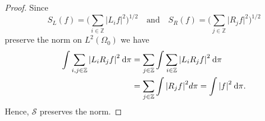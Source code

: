 \documentclass[a4paper]{amsart}
\newcommand{\abs}[1]{{\lvert {#1} \rvert}}
\newcommand{\dpi}{{\: \rm d}\pi}
\newcommand{\ZZ}{\mathbb{Z}}
\newcommand{\calS}{\mathcal{S}}
\theoremstyle{plain}
\theoremstyle{definition}
\theoremstyle{remark}
\numberwithin{equation}{section}
\theoremstyle{plain}
\begin{document}
\begin{proof}
Since
\begin{equation*}
  S_L(f) = \Big(\sum_{i \in \ZZ} \abs{L_i f}^2\Big)^{1/2} \quad \text{and}\quad 
  S_R(f) = \Big(\sum_{j \in \ZZ} \abs{R_j f}^2\Big)^{1/2}
\end{equation*}
preserve the norm on $L^2(\Omega_0)$ we have
\begin{equation}
\label{eq:10}
	\begin{aligned}
	\int \sum_{i,j \in \ZZ} \abs{L_i R_j f}^2 \dpi
	&= \sum_{j \in \ZZ} \int \sum_{i \in \ZZ} \abs{L_i R_j f}^2 \dpi \\
	&= \sum_{j \in \ZZ} \int \abs{R_j f}^2 d\pi 
	= \int \abs{f}^2 \dpi.
	\end{aligned}
\end{equation}
Hence, $\calS$ preserves the norm.


\end{proof}
\end{document}
